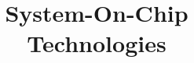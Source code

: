 %
%





\documentclass{latex4ei_fs}

\usepackage{colortbl}

\title{System-On-Chip\\Technologies}




\maketitle

\section{General}

\begin{sectionbox}
	\begin{tablebox}{l | ccccccccc}
	$10^\pm$ 	& $21$ & $18$ & $15$ 	&  $12$ & $9$ &  $6$ & $3$ &  $2$ & $1$ \\ \cmrule
	$+$			& $$ & $$ & $$	& $$ & $$ & $$ & $$ & $$ & $$ \\
	$-$ 		& $$ & $$ & $$ & $$ & $$ & $$ & $$  & $$& $$
	\end{tablebox}
\end{sectionbox}

